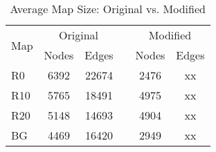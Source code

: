 \begin{table}[h]
  \caption{Average Map Size: Original vs. Modified}
  \label{table-graphsize}
  \centering
  \begin{tabular}{lccccc}
   \hline
  \multirow{2}{*}{Map} & \multicolumn{2}{c}{Original} &     & \multicolumn{2}{c}{Modified} \\
	\cline{2-3}
	\cline{5-6}
	& Nodes & Edges &  & Nodes & Edges \\
\hline
R0 		& 6392 & 22674 & & 2476 & xx \\
R10 	& 5765 & 18491 & & 4975 & xx \\
R20 	& 5148 & 14693 & & 4904 & xx \\ 
BG  	& 4469 & 16420 & & 2949 & xx \\
   \hline
\end{tabular}
\end{table}

